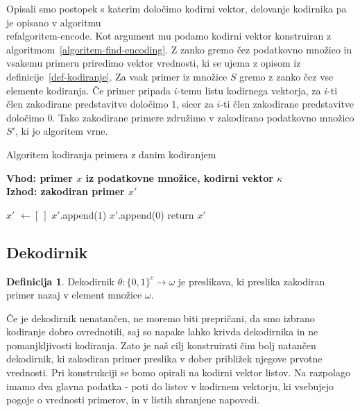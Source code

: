 \documentclass[12pt,a4paper,twoside]{article}
\theoremstyle{definition} %
\newtheorem{definicija}{Definicija}[section]
\theoremstyle{plain} %
\numberwithin{equation}{section}  %
\begin{document}

Opisali smo postopek s katerim določimo kodirni vektor, delovanje kodirnika pa je opisano v algoritmu~\\ref{algoritem-encode}.
Kot argument mu podamo kodirni vektor konstruiran z algoritmom~\ref{algoritem-find-encoding}.
Z zanko gremo čez podatkovno množico in vsakemu primeru priredimo vektor vrednosti, ki se ujema z opisom iz definicije~\ref{def-kodiranje}.
Za vsak primer iz množice $S$ gremo z zanko čez vse elemente kodiranja. 
Če primer pripada $i$-temu listu kodirnega vektorja, za $i$-ti člen zakodirane predstavitve določimo $1$, sicer za $i$-ti člen zakodirane predstavitve določimo $0$.
Tako zakodirane primere združimo v zakodirano podatkovno množico $S'$, ki jo algoritem vrne.

\begin{algorithm}[ht]
  \caption{Algoritem kodiranja primera z danim kodiranjem}
  \label{algoritem-encode}
  \raggedright
  \textbf{Vhod: primer $x$ iz podatkovne množice, kodirni vektor $\kappa$}  \\
  \textbf{Izhod: zakodiran primer $x'$} 
  \begin{algorithmic}[0]
	\State $x'$ $\gets [\ ]$
			\State $x'$.append($1$)
		\Else
			\State $x'$.append($0$)
		\EndIf
	\EndFor
	\State return $x'$
  \end{algorithmic}
\end{algorithm}



\subsection{Dekodirnik}
\label{pogl:dekodirnik}

\begin{definicija}
	\label{def-dekodiranje}
	Dekodirnik $\theta: \{0,1\}^c \rightarrow \omega$ je preslikava, ki preslika zakodiran primer nazaj v element množice $\omega$.
\end{definicija}
Če je dekodirnik nenatančen, ne moremo biti prepričani, da smo izbrano kodiranje dobro ovrednotili, saj so napake lahko krivda dekodirnika in ne pomanjkljivosti kodiranja.
Zato je naš cilj konstruirati čim bolj natančen dekodirnik, ki zakodiran primer preslika v dober približek njegove prvotne vrednosti.
Pri konstrukciji se bomo opirali na kodirni vektor listov.
Na razpolago imamo dva glavna podatka - poti do listov v kodirnem vektorju, ki vsebujejo pogoje o vrednosti primerov, in v listih shranjene napovedi. 
\end{document}
